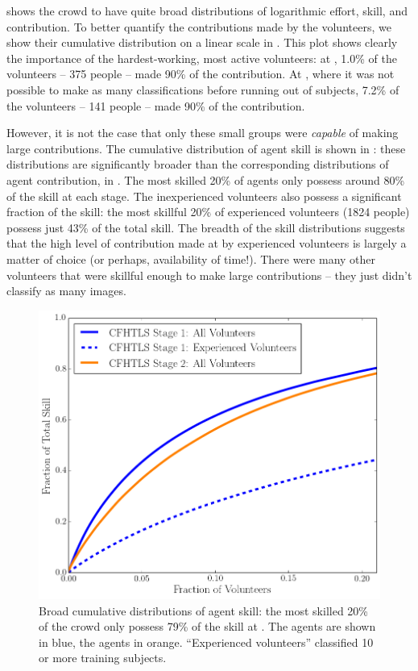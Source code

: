 \documentclass[useAMS,usenatbib,a4paper]{mn2e}
\begin{document}
 shows the \SW crowd to have quite broad
distributions of logarithmic effort, skill, and contribution. To better
quantify the contributions made by the volunteers, we show their cumulative
distribution on a linear scale in . This plot shows
clearly the importance of the hardest-working, most active volunteers: at
\StageOne,  1.0\% of the volunteers -- 375 people -- made 90\% of the
contribution.  At \StageTwo, where it was not possible to make as
many classifications before running out of subjects, 7.2\% of the volunteers
-- 141 people -- made 90\% of the contribution.

However, it is not the case that only these small groups were {\it capable} of
making large contributions. The cumulative distribution of agent skill is shown
in : these distributions are significantly
broader than the corresponding distributions of agent contribution, in
. The most skilled 20\% of agents only possess around
80\% of the skill at each stage. The inexperienced volunteers also possess a
significant fraction of the skill: the most skillful 20\% of experienced
volunteers (1824 people)  possess just 43\% of the total skill. The breadth of
the skill distributions suggests that  the high level of contribution made at
\SW by experienced volunteers is largely a matter of choice (or perhaps,
availability of time!). There were many other volunteers that  were skillful
enough to make large contributions -- they just didn't classify as many images.

\begin{figure}
\centering\includegraphics[width=0.9\linewidth]{sw-system-figs/crowd_skill_cumul.png}
\caption{Broad cumulative distributions of agent skill:
the most skilled 20\% of the crowd only possess 79\% of the skill at \StageOne.
The \StageOne agents
are shown in blue, the \StageTwo agents in orange. ``Experienced volunteers''
classified 10 or more training subjects.}
\label{fig:crowd:cumulskillplot}
\end{figure}
\end{document}
